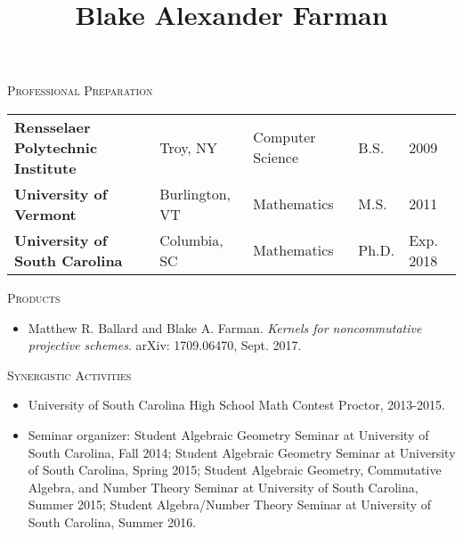 \documentclass[11pt]{article}
\title{Blake Alexander Farman}
\date{}
\begin{document}
\maketitle

\begin{center}
  \textsc{Professional Preparation}
\end{center}
\begin{center}
\begin{tabular}{lllll}
  \textbf{Rensselaer Polytechnic Institute} & Troy, NY & Computer Science & B.S. & 2009\\
  \textbf{University of Vermont} & Burlington, VT & Mathematics & M.S. & 2011\\
  \textbf{University of South Carolina} & Columbia, SC & Mathematics & Ph.D. & Exp. 2018
\end{tabular}
\end{center}

\begin{center}
  \textsc{Products}
\end{center}
\begin{itemize}
\item
  Matthew R. Ballard and Blake A. Farman. \emph{Kernels for noncommutative projective schemes}. arXiv: 1709.06470, Sept. 2017.
\end{itemize}
\begin{center}
  \textsc{Synergistic Activities}
  \begin{itemize}
  \item
    University of South Carolina High School Math Contest Proctor, 2013-2015.
  \item
    Seminar organizer: Student Algebraic Geometry Seminar at University of South Carolina, Fall 2014; Student Algebraic Geometry Seminar at University of South Carolina, Spring 2015; Student Algebraic Geometry, Commutative Algebra, and Number Theory Seminar at University of South Carolina, Summer 2015; Student Algebra/Number Theory Seminar at University of South Carolina, Summer 2016.
  \end{itemize}
\end{center}
\end{document}
